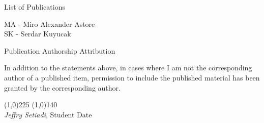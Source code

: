 \newpage

\vspace{3in}

\begin{center}
\begin{Large}
\begin{bfseries}
List of Publications
\end{bfseries}
\end{Large}
\end{center}

\vspace{0.3in}
\hspace{\parindent} MA - Miro Alexander Astore \\
\hspace{\parindent} SK - Serdar Kuyucak \\

\begin{enumerate}

\end{enumerate}

\newpage
\begin{center}
\begin{Large}
\begin{bfseries}
Publication Authorship Attribution
\end{bfseries}
\end{Large}
\end{center}

\vspace{0.3in}
\noindent In addition to the statements above, in cases where I am not the 
corresponding author of a published item, permission to include the published 
material has been granted by the corresponding author.

\vspace{1.in}


\noindent \line(1,0){225} \hspace{3.0cm} \line(1,0){140} \\
 {\em Jeffry Setiadi}, Student \hspace{6.65cm} Date
 
